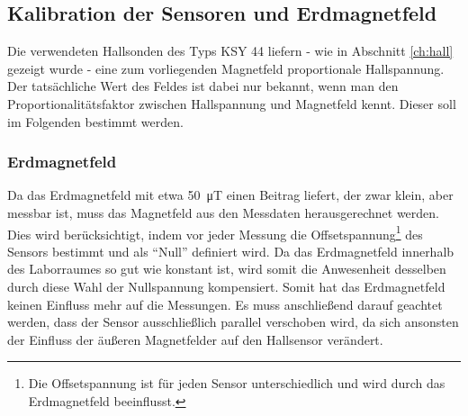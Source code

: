 \documentclass[12pt,a4paper]{article}
\begin{document}
\subsection{Kalibration der Sensoren und Erdmagnetfeld}
Die verwendeten Hallsonden des Typs KSY 44 liefern - wie in Abschnitt \ref{ch:hall} gezeigt wurde - eine zum vorliegenden Magnetfeld proportionale Hallspannung. Der tatsächliche Wert des Feldes ist dabei nur bekannt, wenn man den Proportionalitätsfaktor zwischen Hallspannung und Magnetfeld kennt. Dieser soll im Folgenden bestimmt werden.
\subsubsection{Erdmagnetfeld}
Da das Erdmagnetfeld mit etwa \SI{50}{\micro T} einen Beitrag liefert, der zwar klein, aber messbar ist, muss das Magnetfeld aus den Messdaten herausgerechnet werden. Dies wird berücksichtigt, indem vor jeder Messung die Offsetspannung\footnote{Die Offsetspannung ist für jeden Sensor unterschiedlich und wird durch das Erdmagnetfeld beeinflusst.} des Sensors bestimmt und als "`Null"' definiert wird. Da das Erdmagnetfeld innerhalb des Laborraumes so gut wie konstant ist, wird somit die Anwesenheit desselben durch diese Wahl der Nullspannung kompensiert. Somit hat das Erdmagnetfeld keinen Einfluss mehr auf die Messungen. Es muss anschließend darauf geachtet werden, dass der Sensor ausschließlich parallel verschoben wird, da sich ansonsten der Einfluss der äußeren Magnetfelder auf den Hallsensor verändert.
\end{document}
